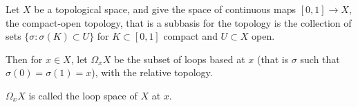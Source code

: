 \documentclass[12pt]{article}
\begin{document}
Let $X$ be a topological space, and give the space of continuous maps $[0,1]\to X$, the compact-open topology, that is a subbasis for the topology is the collection of sets $\{\sigma : \sigma(K)\subset U \}$ for $K\subset [0,1]$ compact and $U\subset X$ open.

Then for $x\in X$, let $\Omega_{x}X$ be the subset of loops based at $x$ (that is $\sigma$ such that $\sigma(0) = \sigma(1) = x$), with the relative topology.

$\Omega_{x}X$ is called the loop space of $X$ at $x$.
\end{document}
